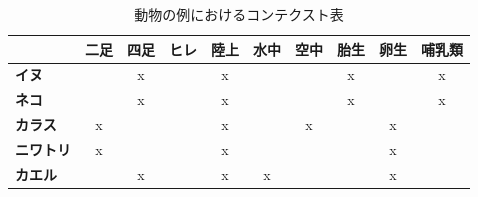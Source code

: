 \documentclass[a4j,8.5pt, twocolumn,fleqn]{jbook}
\begin{document}
\begin{table}[htb]
    \caption{動物の例におけるコンテクスト表}
    \label{context}
    \centering
    \small
    \begin{tabular}{|l|c|c|c|c|c|c|c|c|c|}
        \hline
        \textbf{}          & \multicolumn{1}{l|}{\textbf{二足}} & \multicolumn{1}{l|}{\textbf{四足}} & \multicolumn{1}{l|}{\textbf{ヒレ}} & \multicolumn{1}{l|}{\textbf{陸上}} & \multicolumn{1}{l|}{\textbf{水中}} & \multicolumn{1}{l|}{\textbf{空中}} & \multicolumn{1}{l|}{\textbf{胎生}} & \multicolumn{1}{l|}{\textbf{卵生}} & \multicolumn{1}{l|}{\textbf{哺乳類}} \\ \hline
        \textbf{イヌ}        &                                    & x                                  &                                  & x                                &                                  &                                  & x                                &                                  & x                                 \\ \hline
        \textbf{ネコ}        &                                    & x                                  &                                  & x                                &                                  &                                  & x                                &                                  & x                                 \\ \hline
        \textbf{カラス}       & x                                  &                                    &                                  & x                                &                                  & x                                &                                  & x                                &                                   \\ \hline
        \textbf{ニワトリ}      & x                                  &                                    &                                  & x                                &                                  &                                  &                                  & x                                &                                   \\ \hline
        \textbf{カエル}       &                                    & x                                  &                                  & x                                & x                                &                                  &                                  & x                                &                                   \\ \hline

\end{tabular}
\end{table}
\end{document}
